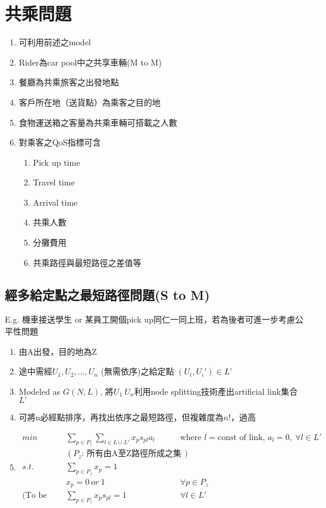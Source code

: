\documentclass{article}
\begin{document}
\section*{共乘問題}

\begin{enumerate}
\def\labelenumi{\arabic{enumi}.}
  \item 可利用前述之model
  \item Rider為car pool中之共享車輛(M to M)
  \item 餐廳為共乘旅客之出發地點
  \item 客戶所在地（送貨點）為乘客之目的地
  \item 食物運送箱之客量為共乘車輛可搭載之人數
  \item 對乘客之QoS指標可含
    \begin{enumerate}
      \def\labelenumii{\arabic{enumii}.}
      \item Pick up time
      \item Travel time
      \item Arrival time
      \item 共乘人數
      \item 分攤費用
      \item 共乘路徑與最短路徑之差值等
    \end{enumerate}
\end{enumerate}

\subsection*{經多給定點之最短路徑問題(S to M)}
E.g. 機車接送學生 or 某員工開個pick up同仁一同上班，若為後者可進一步考慮公平性問題

\begin{enumerate}
\def\labelenumi{\arabic{enumi}.}
  \item 由A出發，目的地為Z
  \item 途中需經\(U_1, U_2, …, U_n\) (無需依序)之給定點 \((U_i, U_i') \in L’\)
  \item Modeled as \(G(N, L)\), 將\(U_1 ~ U_n\)利用node splitting技術產出artificial link集合\(L’\)
  \item 可將n必經點排序，再找出依序之最短路徑，但複雜度為\(n!\)，過高
  \item
    \begin{align*}\tag{LP}
      min & \sum\limits_{p \in P_z} \sum\limits_{l \in L \cup L'} x_p s_{pl} a_l && \text{where } l = \text{const of link, } a_l = 0,\ \forall l \in L' \\
      & (P_z \text{: 所有由A至Z路徑所成之集合}) \\
      s.t. & \sum\limits_{p \in P_z} x_p = 1 \tag{1} \\
      & x_p = 0 \ or \ 1 && \forall p \in P_z \tag{2} \\
      \text{(To be relaxed)} & \sum\limits_{p \in P_z} x_p s_{pl} = 1 && \forall l \in L' \tag{3}
    \end{align*}
\end{enumerate}
\end{document}
